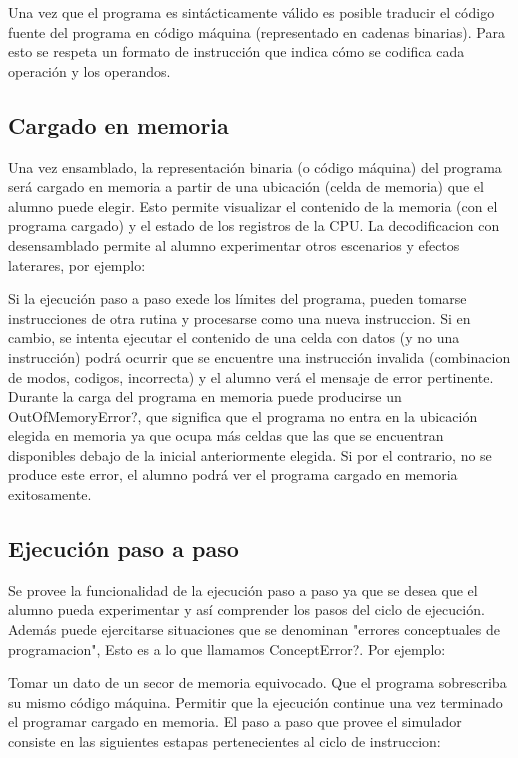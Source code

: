 Una vez que el programa es sintácticamente válido es posible traducir el código fuente del programa en código máquina (representado en cadenas binarias). Para esto se respeta un formato de instrucción que indica cómo se codifica cada operación y los operandos.

\subsection{Cargado en memoria}

Una vez ensamblado, la representación binaria (o código máquina) del programa será cargado en memoria a partir de una ubicación (celda de memoria) que el alumno puede elegir. Esto permite visualizar el contenido de la memoria (con el programa cargado) y el estado de los registros de la CPU. La decodificacion con desensamblado permite al alumno experimentar otros escenarios y efectos laterares, por ejemplo:

Si la ejecución paso a paso exede los límites del programa, pueden tomarse instrucciones de otra rutina y procesarse como una nueva instruccion.
Si en cambio, se intenta ejecutar el contenido de una celda con datos (y no una instrucción) podrá ocurrir que se encuentre una instrucción invalida (combinacion de modos, codigos, incorrecta) y el alumno verá el mensaje de error pertinente.
Durante la carga del programa en memoria puede producirse un OutOfMemoryError?, que significa que el programa no entra en la ubicación elegida en memoria ya que ocupa más celdas que las que se encuentran disponibles debajo de la inicial anteriormente elegida. Si por el contrario, no se produce este error, el alumno podrá ver el programa cargado en memoria exitosamente.

\subsection{Ejecución paso a paso}

Se provee la funcionalidad de la ejecución paso a paso ya que se desea que el alumno pueda experimentar y así comprender los pasos del ciclo de ejecución. Además puede ejercitarse situaciones que se denominan "errores conceptuales de programacion", Esto es a lo que llamamos ConceptError?. Por ejemplo:

Tomar un dato de un secor de memoria equivocado.
Que el programa sobrescriba su mismo código máquina.
Permitir que la ejecución continue una vez terminado el programar cargado en memoria.
El paso a paso que provee el simulador consiste en las siguientes estapas pertenecientes al ciclo de instruccion:

